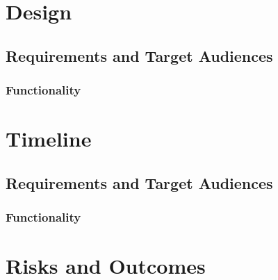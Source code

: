 \documentclass[paper=a4, fontsize=11pt]{scrartcl} %
\numberwithin{equation}{section} %
\numberwithin{figure}{section} %
\numberwithin{table}{section} %
\begin{document}

\section{Design}


\subsection{Requirements and Target Audiences}


\subsubsection{Functionality}


\section{Timeline}


\subsection{Requirements and Target Audiences}


\subsubsection{Functionality}


\section{Risks and Outcomes}
\end{document}
